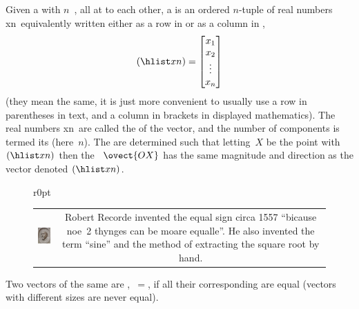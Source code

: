 \begin{definition} \label{def:vecs} 
Given a  with \(n\)~, all at  to each other, a  is an ordered \(n\)-tuple of real numbers \hlist xn\ equivalently written either as a row in  or as a column in ,
\begin{equation*}
(\hlist xn)=\begin{bmatrix} x_1\\x_2\\\vdots\\x_n \end{bmatrix}
\end{equation*}
(they mean the same, it is just more convenient to usually use a row in parentheses in text, and a column in brackets in displayed mathematics).
The real numbers \hlist xn\ are called the  of the vector, and the number of components is termed its  (here~\(n\)).
The  are determined such that letting~\(X\) be the point with  \((\hlist xn)\) then the ~\(\ovect{OX}\) has the same magnitude and direction as the vector denoted \((\hlist xn)\).

\begin{adjustbox}{valign=t,minipage={\linewidth}}
\begin{figure}r{0pt} \begin{tabular}{@{}cc@{}}
\includegraphics[width=4.5em]{Vectors/RobertRecorde}&
\parbox[b]{16em}{\rm
Robert Recorde invented the equal sign circa 1557 ``bicause noe~2 thynges can be moare equalle''.  
He also invented the term ``sine'' and the method of extracting the square root by hand.}
\end{tabular} \end{figure}\strut{}%
Two vectors of the same  are ,~\(=\), if all their corresponding  are equal (vectors with different sizes are never equal).
\vspace{1\baselineskip}
\end{adjustbox}
\end{definition}



